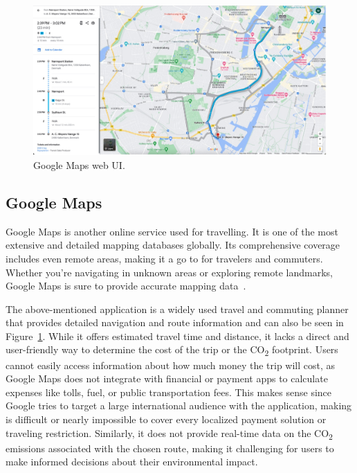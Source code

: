 \begin{figure}
    \centering
    \includegraphics[width=\textwidth]{images/google-maps}
    \caption{Google Maps web UI.}
    \label{fig:figure6}
\end{figure}

\subsection{Google Maps}\label{subsec:google-maps}

Google Maps is another online service used for travelling.
It is one of the most extensive and detailed mapping databases globally.
Its comprehensive coverage includes even remote areas, making it a go to for travelers and commuters.
Whether you're navigating in unknown areas or exploring remote landmarks, Google Maps is sure to provide accurate
mapping data~\cite{googlemaps2023}.

The above-mentioned application is a widely used travel and commuting planner that provides detailed navigation and
route information and can also be seen in Figure~\ref{fig:figure6}.
While it offers estimated travel time and distance, it lacks a direct and user-friendly way to determine the cost of the
trip or the \unit{CO_{2}} footprint.
Users cannot easily access information about how much money the trip will cost, as Google Maps does not integrate with
financial or payment apps to calculate expenses like tolls, fuel, or public transportation fees.
This makes sense since Google tries to target a large international audience with the application, making is difficult
or nearly impossible to cover every localized payment solution or traveling restriction.
Similarly, it does not provide real-time data on the \unit{CO_{2}} emissions associated with the chosen route, making it
challenging for users to make informed decisions about their environmental impact.

